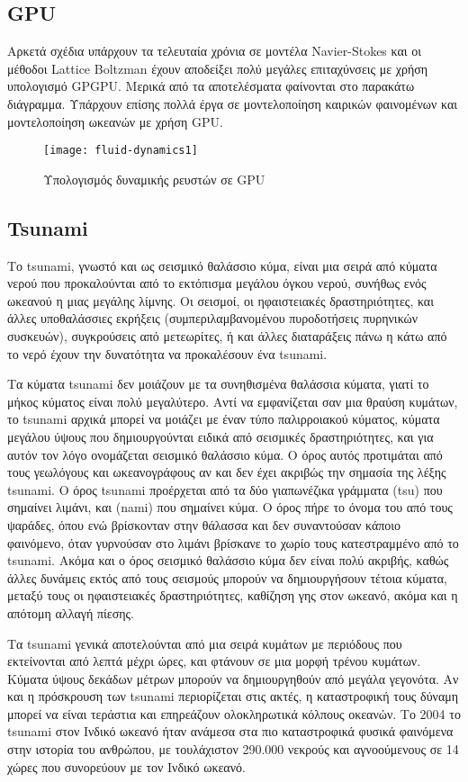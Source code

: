 \subsection{GPU}
Αρκετά σχέδια υπάρχουν τα τελευταία χρόνια σε μοντέλα Navier-Stokes και οι μέθοδοι Lattice Boltzman έχουν αποδείξει πολύ μεγάλες επιταχύνσεις με χρήση υπολογισμό GPGPU. Μερικά από τα αποτελέσματα φαίνονται στο παρακάτω διάγραμμα. Υπάρχουν επίσης πολλά έργα σε μοντελοποίηση καιρικών φαινομένων και μοντελοποίηση ωκεανών με χρήση GPU.

\begin{figure}[h]
\centering
\texttt{[image: fluid-dynamics1]}
\caption{Υπολογισμός δυναμικής ρευστών σε GPU}
\end{figure}
 
\subsection{Tsunami}
Το tsunami, γνωστό και ως σεισμικό θαλάσσιο κύμα, είναι μια σειρά από κύματα νερού που προκαλούνται από το εκτόπισμα μεγάλου όγκου νερού, συνήθως ενός ωκεανού η μιας μεγάλης λίμνης. Οι σεισμοί, οι ηφαιστειακές δραστηριότητες, και άλλες υποθαλάσσιες εκρήξεις (συμπεριλαμβανομένου πυροδοτήσεις πυρηνικών συσκευών), συγκρούσεις από μετεωρίτες, ή και άλλες διαταράξεις πάνω η κάτω από το νερό έχουν την δυνατότητα να προκαλέσουν ένα tsunami.

Τα κύματα tsunami δεν μοιάζουν με τα συνηθισμένα θαλάσσια κύματα, γιατί το μήκος κύματος είναι πολύ μεγαλύτερο. Αντί να εμφανίζεται σαν μια θραύση κυμάτων, το tsunami αρχικά μπορεί να μοιάζει με έναν τύπο παλιρροιακού κύματος,  κύματα μεγάλου ύψους που δημιουργούνται ειδικά από σεισμικές δραστηριότητες, και για αυτόν τον λόγο ονομάζεται σεισμικό θαλάσσιο κύμα. Ο όρος αυτός προτιμάται από τους γεωλόγους και ωκεανογράφους αν και δεν έχει ακριβώς την σημασία της λέξης tsunami. Ο όρος tsunami προέρχεται από τα δύο γιαπωνέζικα γράμματα {\large{}}(tsu) που σημαίνει λιμάνι, και {\large{}}(nami) που σημαίνει κύμα. Ο όρος πήρε το όνομα του από τους ψαράδες, όπου ενώ βρίσκονταν στην θάλασσα και δεν συναντούσαν κάποιο φαινόμενο, όταν γυρνούσαν στο λιμάνι βρίσκανε το χωρίο τους κατεστραμμένο από το tsunami. Ακόμα και ο όρος σεισμικό θαλάσσιο κύμα δεν είναι πολύ ακριβής, καθώς άλλες δυνάμεις εκτός από τους σεισμούς μπορούν να δημιουργήσουν τέτοια κύματα, μεταξύ τους οι ηφαιστειακές δραστηριότητες, καθίζηση γης στον ωκεανό, ακόμα και η απότομη αλλαγή πίεσης.
 
Τα tsunami γενικά αποτελούνται από μια σειρά κυμάτων με περιόδους που εκτείνονται από λεπτά μέχρι ώρες, και φτάνουν σε μια μορφή τρένου κυμάτων. Κύματα ύψους δεκάδων μέτρων μπορούν να δημιουργηθούν από μεγάλα γεγονότα. Αν και η πρόσκρουση των tsunami περιορίζεται στις ακτές, η καταστροφική τους δύναμη μπορεί να είναι τεράστια και επηρεάζουν ολοκληρωτικά κόλπους οκεανών. Το 2004 το tsunami στον Ινδικό ωκεανό ήταν ανάμεσα στα πιο καταστροφικά φυσικά φαινόμενα στην ιστορία του ανθρώπου, με τουλάχιστον 290.000 νεκρούς και αγνοούμενους σε 14 χώρες που συνορεύουν με τον Ινδικό ωκεανό.

